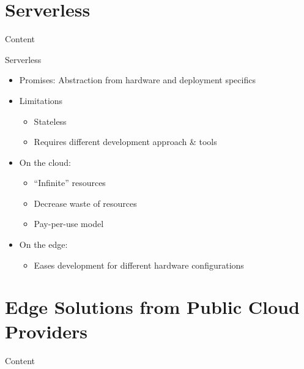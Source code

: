 \documentclass[10pt,xcolor={dvipsnames},notes]{beamer}
\begin{document}
\section{Serverless}
\begin{frame}{Content}{}
\tableofcontents[currentsection]
\end{frame}


\begin{frame}{Serverless}{}

\begin{itemize}
    \item Promises: Abstraction from hardware and deployment specifics
  
    \item Limitations
  \begin{itemize}
      \item Stateless
      \item Requires different development approach \& tools
  \end{itemize}
  \item On the cloud:
  \begin{itemize}
    \item ``Infinite'' resources
    \item Decrease waste of resources
    \item Pay-per-use model
  \end{itemize}
  \item On the edge:
  \begin{itemize}
    \item Eases development for different hardware configurations
  \end{itemize}


\end{itemize}
\end{frame}

\section{Edge Solutions from Public Cloud Providers}
\begin{frame}{Content}{}
\tableofcontents[currentsection]
\end{frame}
\end{document}
